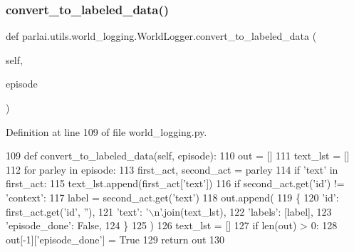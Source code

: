 \subsubsection{\texorpdfstring{convert\+\_\+to\+\_\+labeled\+\_\+data()}{convert\_to\_labeled\_data()}}
{\footnotesize\ttfamily def parlai.\+utils.\+world\+\_\+logging.\+World\+Logger.\+convert\+\_\+to\+\_\+labeled\+\_\+data (\begin{DoxyParamCaption}\item[{}]{self,  }\item[{}]{episode }\end{DoxyParamCaption})}



Definition at line 109 of file world\+\_\+logging.\+py.


\begin{DoxyCode}
109     \textcolor{keyword}{def }convert\_to\_labeled\_data(self, episode):
110         out = []
111         text\_lst = []
112         \textcolor{keywordflow}{for} parley \textcolor{keywordflow}{in} episode:
113             first\_act, second\_act = parley
114             \textcolor{keywordflow}{if} \textcolor{stringliteral}{'text'} \textcolor{keywordflow}{in} first\_act:
115                 text\_lst.append(first\_act[\textcolor{stringliteral}{'text'}])
116             \textcolor{keywordflow}{if} second\_act.get(\textcolor{stringliteral}{'id'}) != \textcolor{stringliteral}{'context'}:
117                 label = second\_act.get(\textcolor{stringliteral}{'text'})
118                 out.append(
119                     \{
120                         \textcolor{stringliteral}{'id'}: first\_act.get(\textcolor{stringliteral}{'id'}, \textcolor{stringliteral}{''}),
121                         \textcolor{stringliteral}{'text'}: \textcolor{stringliteral}{'\(\backslash\)n'}.join(text\_lst),
122                         \textcolor{stringliteral}{'labels'}: [label],
123                         \textcolor{stringliteral}{'episode\_done'}: \textcolor{keyword}{False},
124                     \}
125                 )
126                 text\_lst = []
127         \textcolor{keywordflow}{if} len(out) > 0:
128             out[-1][\textcolor{stringliteral}{'episode\_done'}] = \textcolor{keyword}{True}
129         \textcolor{keywordflow}{return} out
130 
\end{DoxyCode}
\mbox{\label{classparlai_1_1utils_1_1world__logging_1_1WorldLogger_a98460ce773e615dabd51e1f3ffb45db3}} 
